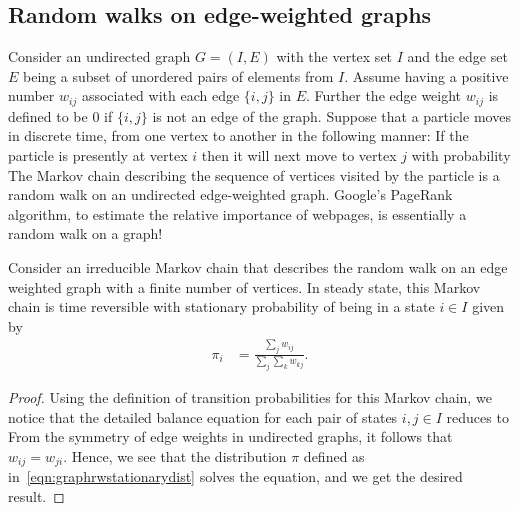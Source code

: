 \documentclass[a4paper,10pt,english]{article}
\begin{document}


\subsection{Random walks on edge-weighted graphs}
Consider an undirected graph $G = (I,E)$ with the vertex set $I$ and the edge set $E$ being a subset of unordered pairs of elements from $I$. 
Assume having a positive number $w_{ij}$ associated with each edge $\{i,j\}$ in $E$. 
Further the edge weight $w_{ij}$ is defined to be 0 if $\{i,j\}$ is not an edge of the graph. 
Suppose that a particle moves in discrete time, from one vertex to another in the following manner: If the particle is presently at vertex  $i$ then it will next move to vertex $j$ with probability
The Markov chain describing the sequence of vertices visited by the particle is a random walk on an undirected edge-weighted graph. 
Google's PageRank algorithm, to estimate the relative importance of webpages, is essentially a random walk on a graph!


\begin{prop}
Consider an irreducible Markov chain that describes the random walk on an edge weighted graph with a finite number of vertices. 
In steady state, this Markov chain is time reversible with stationary probability of being in a state $i \in I$ given by 
\begin{align}
\label{eqn:graphrwstationarydist}
\pi_i &= \frac{\sum_{j}w_{ij}}{\sum_{j}\sum_{k}w_{kj}}. %
\end{align}
\end{prop}
\begin{proof}
Using the definition of transition probabilities for this Markov chain, 
we notice that the detailed balance equation for each pair of states $i, j \in I$ 
reduces to 
From the symmetry of edge weights in undirected graphs, it follows that $w_{ij}=w_{ji}$. 
Hence, we see that the distribution $\pi$ defined as in~\eqref{eqn:graphrwstationarydist} solves the equation, and we get the desired result.
\end{proof}
\end{document}
